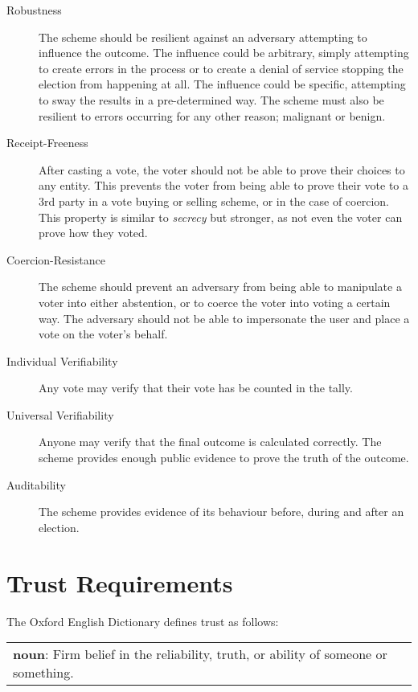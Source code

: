 \begin{description}
    \item[Robustness] The scheme should be resilient against an adversary attempting to influence the outcome. The influence could be arbitrary, simply attempting to create errors in the process or to create a denial of service stopping the election from happening at all. The influence could be specific, attempting to sway the results in a pre-determined way. The scheme must also be resilient to errors occurring for any other reason; malignant or benign.
    \item[Receipt-Freeness] After casting a vote, the voter should not be able to prove their choices to any entity. This prevents the voter from being able to prove their vote to a 3rd party in a vote buying or selling scheme, or in the case of coercion. This property is similar to \emph{secrecy} but stronger, as not even the voter can prove how they voted.
    \item[Coercion-Resistance] The scheme should prevent an adversary from being able to manipulate a voter into either abstention, or to coerce the voter into voting a certain way. The adversary should not be able to impersonate the user and place a vote on the voter's behalf.
    \item[Individual Verifiability] Any vote may verify that their vote has be counted in the tally.
    \item[Universal Verifiability] Anyone may verify that the final outcome is calculated correctly. The scheme provides enough public evidence to prove the truth of the outcome.
    \item[Auditability] The scheme provides evidence of its behaviour before, during and after an election.
\end{description}

\section{Trust Requirements}
\label{ch:req:trust}

The Oxford English Dictionary defines trust as follows:

\vspace{1em}
\noindent \begin{tabular}{|p{}}
    \noindent \textbf{noun}: Firm belief in the reliability, truth, or ability of someone or something.
\end{tabular}
\vspace{1em}

